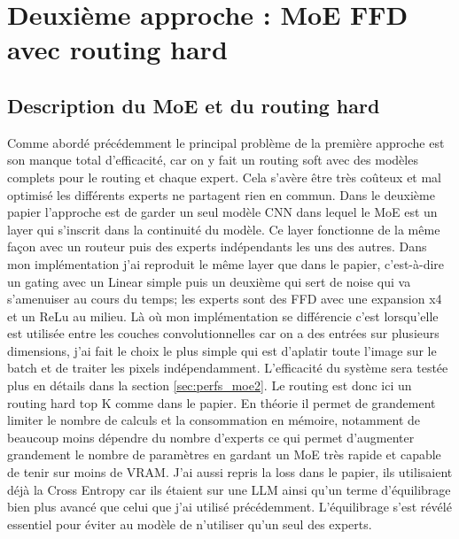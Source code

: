\documentclass{article}
\begin{document}
\begin{table}[t]
\caption{Comparaison des différentes variantes de fonctions de perte pour la première approche,
en termes de performances, temps d'entraînement et métriques de routing. \\
\# used*: cela correspond au nombre d'experts réellement utilisés\\
base** "taille" (\# paramètres): sont les modèles de base, sans MoE, de même taille que 1 expert}
\label{tab:moe_paper1_comparison}
\end{table}




\section{Deuxième approche : MoE FFD avec routing hard}

\subsection{Description du MoE et du routing hard}

Comme abordé précédemment le principal problème de la première approche est son manque total d'efficacité, car on y fait un routing soft avec des modèles complets pour le routing et chaque expert. Cela s'avère être très coûteux et mal optimisé les différents experts ne partagent rien en commun. Dans le deuxième papier \cite{paper2} l'approche est de garder un seul modèle CNN dans lequel le MoE est un layer qui s'inscrit dans la continuité du modèle. Ce layer fonctionne de la même façon avec un routeur puis des experts indépendants les uns des autres. Dans mon implémentation j'ai reproduit le même layer que dans le papier, c'est-à-dire un gating avec un Linear simple puis un deuxième qui sert de noise qui va s'amenuiser au cours du temps; les experts sont des FFD avec une expansion x4 et un ReLu au milieu. Là où mon implémentation se différencie c'est lorsqu'elle est utilisée entre les couches convolutionnelles car on a des entrées sur plusieurs dimensions, j'ai fait le choix le plus simple qui est d'aplatir toute l'image sur le batch et de traiter les pixels indépendamment. L'efficacité du système sera testée plus en détails dans la section \ref{sec:perfs_moe2}. Le routing est donc ici un routing hard top K comme dans le papier. En théorie il permet de grandement limiter le nombre de calculs et la consommation en mémoire, notamment de beaucoup moins dépendre du nombre d'experts ce qui permet d'augmenter grandement le nombre de paramètres en gardant un MoE très rapide et capable de tenir sur moins de VRAM. J'ai aussi repris la loss dans le papier, ils utilisaient déjà la Cross Entropy car ils étaient sur une LLM ainsi qu'un terme d'équilibrage bien plus avancé que celui que j'ai utilisé précédemment. L'équilibrage s'est révélé essentiel pour éviter au modèle de n'utiliser qu'un seul des experts.
\end{document}

